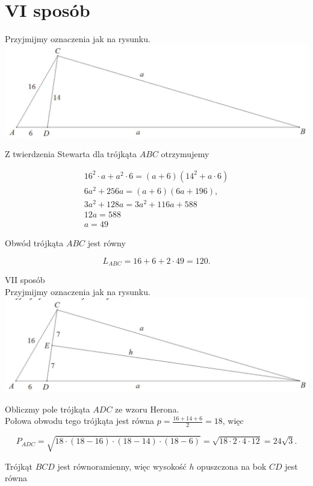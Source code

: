 \documentclass[10pt]{article}
\begin{document}
\section*{VI sposób}
Przyjmijmy oznaczenia jak na rysunku.\\
\includegraphics[max width=\textwidth, center]{2025_02_07_d712b9a47aa2c64928dbg-28(1)}

Z twierdzenia Stewarta dla trójkąta $A B C$ otrzymujemy

$$
\begin{gathered}
16^{2} \cdot a+a^{2} \cdot 6=(a+6)\left(14^{2}+a \cdot 6\right) \\
6 a^{2}+256 a=(a+6)(6 a+196), \\
3 a^{2}+128 a=3 a^{2}+116 a+588 \\
12 a=588 \\
a=49
\end{gathered}
$$

Obwód trójkąta $A B C$ jest równy

$$
L_{A B C}=16+6+2 \cdot 49=120 .
$$

VII sposób\\
Przyjmijmy oznaczenia jak na rysunku.\\
\includegraphics[max width=\textwidth, center]{2025_02_07_d712b9a47aa2c64928dbg-28}

Obliczmy pole trójkąta $A D C$ ze wzoru Herona.\\
Połowa obwodu tego trójkąta jest równa $p=\frac{16+14+6}{2}=18$, więc

$$
P_{A D C}=\sqrt{18 \cdot(18-16) \cdot(18-14) \cdot(18-6)}=\sqrt{18 \cdot 2 \cdot 4 \cdot 12}=24 \sqrt{3} .
$$

Trójkąt $B C D$ jest równoramienny, więc wysokość $h$ opuszczona na bok $C D$ jest równa
\end{document}
